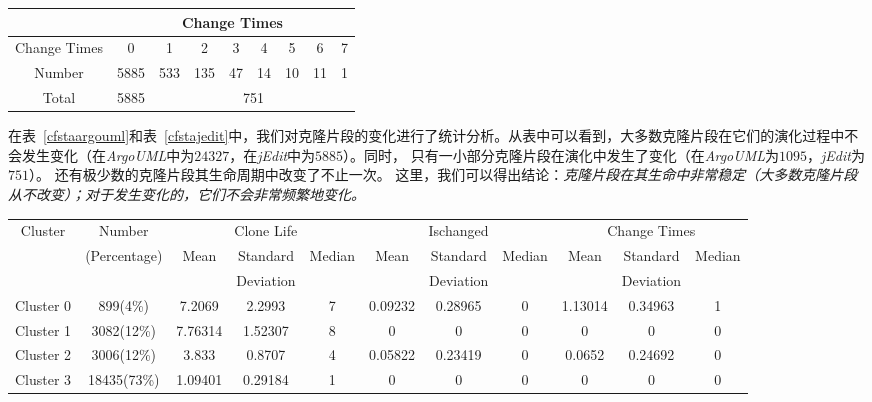 \begin{table}[htbp]
\vspace{0.5em}\centering\wuhao
\begin{tabular}{ccccccccc}
\toprule[1.5pt]
 & \multicolumn{8}{c}{Change Times}\\
\midrule[1pt]
Change Times &0&1&2&3&4&5&6&7\\ 
Number&5885&533&135&47&14&10&11&1\\ 
Total&5885&\multicolumn{7}{c}{751}   \\ 
\bottomrule[1.5pt]
\end{tabular}
\end{table}

在表~\ref{cfstaargouml}和表~\ref{cfstajedit}中，我们对克隆片段的变化进行了统计分析。从表中可以看到，大多数克隆片段在它们的演化过程中不会发生变化（在{\em ArgoUML}中为$24327$，在{\em jEdit}中为$5885$）。同时， 只有一小部分克隆片段在演化中发生了变化（在{\em ArgoUML}为$1095$，{\em jEdit}为$751$）。 还有极少数的克隆片段其生命周期中改变了不止一次。 这里，我们可以得出结论：{\em 克隆片段在其生命中非常稳定（大多数克隆片段从不改变）；对于发生变化的，它们不会非常频繁地变化。}

\begin{table}[htbp]
\vspace{0.5em}\centering\wuhao
\begin{tabular}{ccccccccccc}
\toprule[1.5pt]
\multirow{3}{*}{Cluster}&{Number}&\multicolumn{3}{c}{Clone Life}&\multicolumn{3}{c}{Ischanged}&\multicolumn{3}{c}{Change Times} \\
&(Percentage)&\multirow{2}{*}{Mean}& Standard &\multirow{2}{*}{Median}&\multirow{2}{*}{Mean}&Standard &\multirow{2}{*}{Median}&\multirow{2}{*}{Mean}&Standard &\multirow{2}{*}{Median}\\
&&&  Deviation&&& Deviation&&& Deviation&\\ 
\midrule[1pt]
Cluster 0&899(4\%)&7.2069&2.2993&7&0.09232&0.28965&0&1.13014&0.34963&1\\ 
Cluster 1&3082(12\%)&7.76314&1.52307&8&0&0&0	&0&0&0\\ 
Cluster 2&3006(12\%)&3.833&0.8707&4&0.05822&0.23419	&0	&0.0652&0.24692&0\\ 
Cluster 3&18435(73\%)&1.09401&0.29184	&1	&0	&0	&0	&0	&0	&0\\ 
\bottomrule[1.5pt]
\end{tabular}
\end{table}

